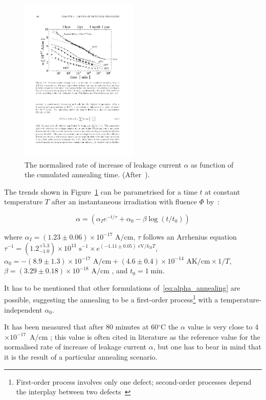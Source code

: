  \begin{figure}[!htbp]
 \centering
 \includegraphics[width=0.5\textwidth]{alpha_annealing.pdf}
 \caption{\label{fig:alpha_annealing}The normalised rate of increase of leakage current $\alpha$ as 
 function of the cumulated annealing time. (After~\cite{moll-thesis}).}
 \end{figure}
 The trends shown in Figure~\ref{fig:alpha_annealing} can be parametrised for a time $t$ at constant 
 temperature $T$ after an instantaneous irradiation with fluence $\Phi$ by~\cite{moll-thesis}:
 
 \begin{equation}
\alpha = \left(\alpha_Ie^{-t/\tau}+\alpha_0-\beta\log(t/t_0)\right)
\label{eq:alpha_annealing}
\end{equation}
 
 \noindent  where $\alpha_I=(1.23\pm0.06)\times 10^{-17}\text{ A}/\text{cm}$, $\tau$ follows an Arrhenius equation $\tau^{-1}=(1.2^{+5.3}_{-1.0})\times 10^{13}\text{ s}^{-1}\times e^{(-1.11\pm 0.05)\text{ eV}/k_BT}$, $\alpha_0=-(8.9\pm1.3)\times 10^{-17}\text{ A}/\text{cm}+(4.6\pm0.4)\times10^{-14}\text{ AK}/\text{cm}\times 1/T$, $\beta=(3.29\pm 0.18)\times 10^{-18}\text{ A}/\text{cm}$ , and $t_0=1\;$min.
 
 It has to be mentioned that other formulations of~\ref{eq:alpha_annealing} are possible, 
 suggesting the annealing to be a 
 first-order process\footnote{First-order process involves only one defect; second-order processes 
 depend the interplay between two defects~\cite{Lutz:411172}} with a temperature-independent $\alpha_0$.
 
It has been measured that after 80 minutes at 60$^\circ$C the $\alpha$ value is very close to
 4$\times10^{-17}$~A/cm \cite{moll-thesis}; this value is often cited in literature as the 
 reference value for the normalised rate of increase of leakage current $\alpha$, 
 but one has to bear in mind that 
 it is the result of a particular annealing scenario.

